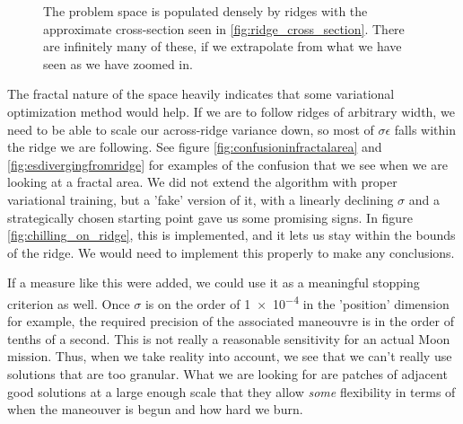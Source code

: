 \begin{figure}[h]
    \centering
    \hfill
    \caption{The problem space is populated densely by ridges with the approximate cross-section seen in \ref{fig:ridge_cross_section}. There are infinitely many of these, if we extrapolate from what we have seen as we have zoomed in.}
\end{figure}

The fractal nature of the space heavily indicates that some variational optimization method would help. If we are to follow ridges of arbitrary width, we need to be able to scale our across-ridge variance down, so most of $\sigma\epsilon$ falls within the ridge we are following. See figure \ref{fig:confusioninfractalarea} and \ref{fig:esdivergingfromridge} for examples of the confusion that we see when we are looking at a fractal area. We did not extend the algorithm with proper variational training, but a 'fake' version of it, with a linearly declining $\sigma$ and a strategically chosen starting point gave us some promising signs. In figure \ref{fig:chilling_on_ridge}, this is implemented, and it lets us stay within the bounds of the ridge. We would need to implement this properly to make any conclusions. 

If a measure like this were added, we could use it as a meaningful stopping criterion as well. Once $\sigma$ is on the order of \num{1e-4} in the 'position' dimension for example, the required precision of the associated maneouvre is in the order of tenths of a second. This is not really a reasonable sensitivity for an actual Moon mission. Thus, when we take reality into account, we see that we can't really use solutions that are too granular. What we are looking for are patches of adjacent good solutions at a large enough scale that they allow \emph{some} flexibility in terms of when the maneouver is begun and how hard we burn.

